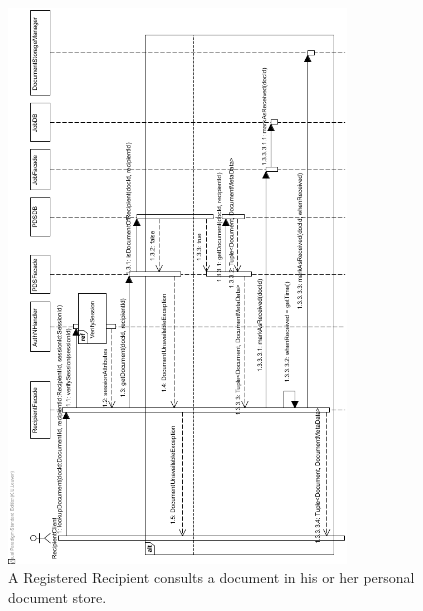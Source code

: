 \documentclass[a4paper,10pt]{article}
\begin{document}
\begin{figure}[!htp]
    \centering
    \includegraphics[width=0.8\textwidth]{Seq_UC14ConsultDocumentInPDS.png}
    \caption{A Registered Recipient consults a document in his or her personal document store.
        }\label{fig:seq_UC14ConsultdocumentInPDS}
\end{figure}
\end{document}
